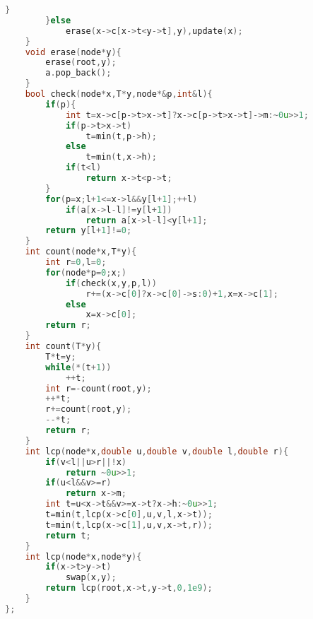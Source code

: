 \documentclass{book}
\begin{document}
\begin{lstlisting}[language=C++,title={Suffix Array (Treap).hpp (3803 bytes, 147 lines)}]
            }
        }else
            erase(x->c[x->t<y->t],y),update(x);
    }
    void erase(node*y){
        erase(root,y);
        a.pop_back();
    }
    bool check(node*x,T*y,node*&p,int&l){
        if(p){
            int t=x->c[p->t>x->t]?x->c[p->t>x->t]->m:~0u>>1;
            if(p->t>x->t)
                t=min(t,p->h);
            else
                t=min(t,x->h);
            if(t<l)
                return x->t<p->t;
        }
        for(p=x;l+1<=x->l&&y[l+1];++l)
            if(a[x->l-l]!=y[l+1])
                return a[x->l-l]<y[l+1];
        return y[l+1]!=0;
    }
    int count(node*x,T*y){
        int r=0,l=0;
        for(node*p=0;x;)
            if(check(x,y,p,l))
                r+=(x->c[0]?x->c[0]->s:0)+1,x=x->c[1];
            else
                x=x->c[0];
        return r;
    }
    int count(T*y){
        T*t=y;
        while(*(t+1))
            ++t;
        int r=-count(root,y);
        ++*t;
        r+=count(root,y);
        --*t;
        return r;
    }
    int lcp(node*x,double u,double v,double l,double r){
        if(v<l||u>r||!x)
            return ~0u>>1;
        if(u<l&&v>=r)
            return x->m;
        int t=u<x->t&&v>=x->t?x->h:~0u>>1;
        t=min(t,lcp(x->c[0],u,v,l,x->t));
        t=min(t,lcp(x->c[1],u,v,x->t,r));
        return t;
    }
    int lcp(node*x,node*y){
        if(x->t>y->t)
            swap(x,y);
        return lcp(root,x->t,y->t,0,1e9);
    }
};
\end{lstlisting}
\end{document}
